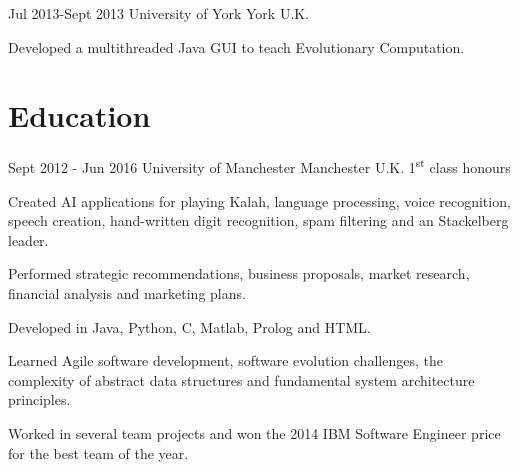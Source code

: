 \documentclass[10pt]{CurriculumVitae}
\begin{document}
      {Jul 2013-Sept 2013}
      {University of York}
      {York}
      {U.K.}
      {
         \item Developed a multithreaded Java GUI to teach Evolutionary Computation.
      } 


  \section{Education}
   
      {Sept 2012 - Jun 2016}
      {University of Manchester}
      {Manchester}
      {U.K.}
      {1\textsuperscript{st} class honours}
      {
         \item Created AI applications for playing Kalah, language processing, voice recognition, speech creation, 
         hand-written digit recognition, spam filtering and an Stackelberg leader.
         \item Performed strategic recommendations, business proposals, market research, financial analysis and marketing plans.
         \item Developed in Java, Python, C, Matlab, Prolog and HTML.
         \item Learned Agile software development, software evolution challenges, the complexity of abstract data structures and
          fundamental system architecture principles. 
         \item Worked in several team projects and won the 2014 IBM Software Engineer price for the best team of the year.
      }
\end{document}

